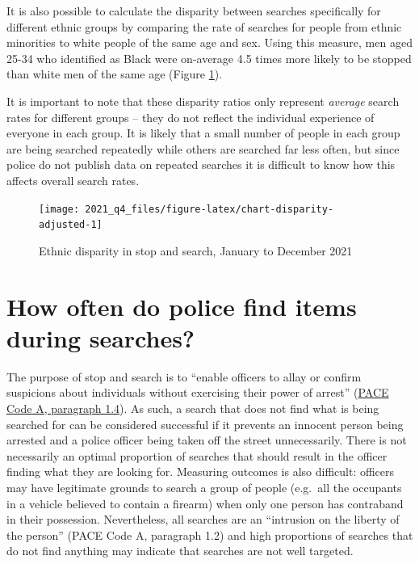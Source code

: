 \documentclass[
  a4paper,
  twoside, 11pt]{article}
\begin{document}
It is also possible to calculate the disparity between searches specifically for different ethnic groups by comparing the rate of searches for people from ethnic minorities to white people of the same age and sex. Using this measure, men aged 25-34 who identified as Black were on-average 4.5 times more likely to be stopped than white men of the same age (Figure \ref{fig:chart-disparity-adjusted}).

It is important to note that these disparity ratios only represent \emph{average} search rates for different groups -- they do not reflect the individual experience of everyone in each group. It is likely that a small number of people in each group are being searched repeatedly while others are searched far less often, but since police do not publish data on repeated searches it is difficult to know how this affects overall search rates.



\begin{figure}[tb]

{\centering \texttt{[image: 2021\_q4\_files/figure-latex/chart-disparity-adjusted-1]} 

}

\caption{Ethnic disparity in stop and search, January to December 2021}\label{fig:chart-disparity-adjusted}
\end{figure}

\hypertarget{how-often-do-police-find-items-during-searches}{%
\section{How often do police find items during searches?}\label{how-often-do-police-find-items-during-searches}}

The purpose of stop and search is to ``enable officers to allay or confirm suspicions about individuals without exercising their power of arrest'' (\href{https://www.gov.uk/guidance/police-and-criminal-evidence-act-1984-pace-codes-of-practice}{PACE Code A, paragraph 1.4}). As such, a search that does not find what is being searched for can be considered successful if it prevents an innocent person being arrested and a police officer being taken off the street unnecessarily. There is not necessarily an optimal proportion of searches that should result in the officer finding what they are looking for. Measuring outcomes is also difficult: officers may have legitimate grounds to search a group of people (e.g.~all the occupants in a vehicle believed to contain a firearm) when only one person has contraband in their possession. Nevertheless, all searches are an ``intrusion on the liberty of the person'' (PACE Code A, paragraph 1.2) and high proportions of searches that do not find anything may indicate that searches are not well targeted.
\end{document}
